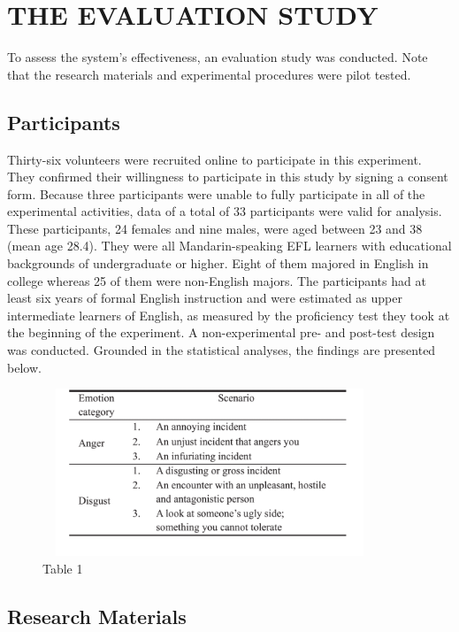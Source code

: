 \documentclass[a4paper,12pt,oneside]{article}
\begin{document}
\newpage
\section{THE EVALUATION STUDY}
To assess the system’s effectiveness, an evaluation study was conducted. Note that the research materials and experimental procedures were pilot tested. 

\subsection{Participants}

Thirty-six volunteers were recruited online to participate in this experiment. They confirmed their willingness to participate in this study by signing a consent form. Because three participants were unable to fully participate in all of the experimental activities, data of a total of 33 participants were valid for analysis. These participants, 24 females and nine males, were aged between 23 and 38 (mean age 28.4). They were all Mandarin-speaking EFL learners with educational backgrounds of undergraduate or higher. Eight of them majored in English in college whereas 25 of them were non-English majors. The participants had at least six years of formal English instruction and were estimated as upper intermediate learners of English, as measured by the proficiency test they took at the beginning of the experiment. A non-experimental pre- and post-test design was conducted. Grounded in the statistical analyses, the findings are presented below. 

\begin{figure}[H]
\includegraphics[height=5cm,width=10cm]{Table1.png}
\centering
\caption{Table 1}
\end{figure}

\subsection{Research Materials}
\end{document}
